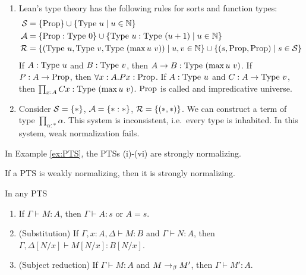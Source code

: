 \begin{example}
\begin{enumerate}
{        }
        \item{
            Lean's type theory has the following rules for sorts and function types: 
            \begin{align*}
                \fS &= \{\proptype\} \cup \{ \typeu{u} \mid u \in \bN\} \\
                \fA &= \{\proptype : \typeu{0}\} \cup \{\typeu{u} : \typeu{(u + 1)} \mid u \in \bN\} \\
                \fR &= \{ (\typeu{u}, \typeu{v}, \typeu{(\max u\ v)}) \mid u,v \in \bN\} \cup \{(s, \proptype, \proptype) \mid s \in \fS\}
            \end{align*}
            If $A : \mathrm{Type}\ u$ and $B : \mathrm{Type}\ v$, then $A \to B : \mathrm{Type}\ (\max u\ v)$.
            If $P : A \to \mathrm{Prop}$, then $\forall x : A. Px : \mathrm{Prop}$. 
            If $A : \mathrm{Type}\ u$ and $C : A \to \mathrm{Type}\ v$, then $\prod_{x : A} Cx : \mathrm{Type}\ (\max u \ v)$.
            $\mathrm{Prop}$ is called and \alert{impredicative universe}.
        }
        \item {
            Consider $\mathcal{S} = \{*\}$, $\mathcal{A} = \{* :*\}$, $\mathcal{R} = \{(*, *)\}$. 
            We can construct a term of type $\prod_{\alpha : *} \alpha$. 
            This system is \alert{inconsistent}, i.e.\ every type is inhabited. 
            In this system, weak normalization fails. 
        }
    \end{enumerate}
\end{example}

\begin{boxthm}
    In Example \ref{ex:PTS}, the PTSs (i)-(vi) are strongly normalizing.
\end{boxthm}

\begin{conj}
    If a PTS is weakly normalizing, then it is strongly normalizing. 
\end{conj}

\begin{boxprop}\label{prop:PTS}
    In any PTS 
    \begin{enumerate}
        \item If $\Gamma \vdash M : A$, then $\Gamma \vdash A : s$ or $A = s$.
        \item (Substitution) If $\Gamma, x : A, \Delta \vdash M : B$ and $\Gamma \vdash N : A$, then $\Gamma, \Delta[N/x] \vdash M[N/x] : B[N/x]$.
        \item (Subject reduction) If $\Gamma \vdash M : A$ and $M \to_{\beta} M'$, then $\Gamma \vdash M' : A$.
    \end{enumerate}
\end{boxprop}

